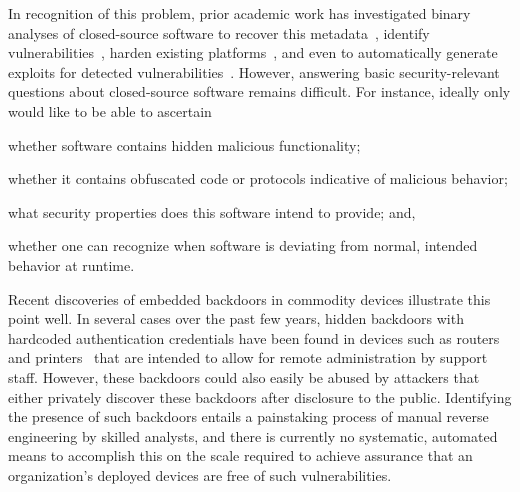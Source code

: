 \documentclass[letterpaper,twoside,11pt,headings=small]{scrartcl}
\begin{document}
In recognition of this problem, prior academic work has investigated binary
analyses of closed-source software to recover this
metadata~\cite{lee:ndss2011:tie}, identify vulnerabilities~\cite{kruegel:acsac2004:kernel}, harden existing
platforms~\cite{baliga:gibraltar,chipounov:asplos2011:s2e}, and even to automatically generate
exploits for detected vulnerabilities~\cite{kruegel:sec2005:mimicry,avgerinos:ndss2011:aeg,schwartz:sec2011:q,cha:oakland2012:mayhem}.
However, answering basic security-relevant questions about closed-source
software remains difficult.  For instance, ideally only would like to be
able to ascertain%
\begin{inparaenum}
    \item whether software contains hidden malicious functionality;
    \item whether it contains obfuscated code or protocols indicative of malicious behavior;
    \item what security properties does this software intend to provide; and,
    \item whether one can recognize when software is deviating from normal, intended behavior at runtime.
\end{inparaenum}

Recent discoveries of embedded backdoors in commodity devices illustrate this
point well.  In several cases over the past few years, hidden backdoors with
hardcoded authentication credentials have been found in devices such as
routers~\cite{heffner:dlink-dir100} and printers~\cite{cert:hp-backdoor} that
are intended to allow for remote administration by support staff.  However,
these backdoors could also easily be abused by attackers that either privately
discover these backdoors after disclosure to the public.  Identifying the
presence of such backdoors entails a painstaking process of manual reverse
engineering by skilled analysts, and there is currently no systematic,
automated means to accomplish this on the scale required to achieve assurance
that an organization's deployed devices are free of such vulnerabilities.
\end{document}
